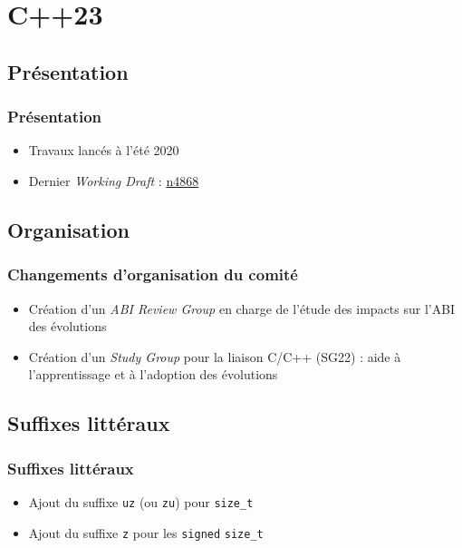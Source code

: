 \documentclass[C++.tex]{subfiles}
\begin{document}
\section{C++23}
\subsection*{Présentation}
\begin{frame}
	\frametitle{Présentation}
	\begin{itemize}
		\item Travaux lancés à l'été 2020
		\item Dernier \textit{Working Draft} : \href{https://github.com/cplusplus/draft/releases/download/n4868/n4868.pdf}{n4868}
	\end{itemize}
\end{frame}

\subsection*{Organisation}
\begin{frame}
	\frametitle{Changements d'organisation du comité}
	\begin{itemize}
		\item Création d'un \textit{ABI Review Group} en charge de l'étude des impacts sur l'ABI des évolutions
		\item Création d'un \textit{Study Group} pour la liaison C/C++ (SG22) : aide à l'apprentissage et à l'adoption des évolutions
	\end{itemize}
\end{frame}

\subsection*{Suffixes littéraux}
\begin{frame}[fragile]
	\frametitle{Suffixes littéraux}
	\begin{itemize}
		\item Ajout du suffixe \lstinline|uz| (ou \lstinline|zu|) pour \lstinline|size_t|
		\item Ajout du suffixe \lstinline|z| pour les \og \lstinline|signed|\fg{} \lstinline|size_t|

	\end{itemize}
\end{frame}
\end{document}
